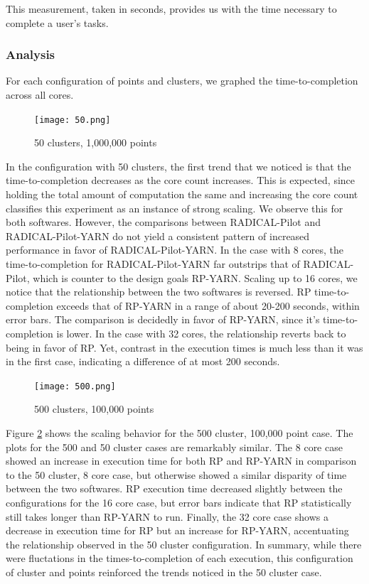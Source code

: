 \documentclass[]{article}
\begin{document}
			This measurement, taken in seconds, provides us with the time necessary to complete a user's tasks.

		\subsubsection{Analysis}

			For each configuration of points and clusters, we graphed the time-to-completion across all cores.

			\begin{figure}[H]
				\centering
				\texttt{[image: 50.png]}
				\caption{50 clusters, 1,000,000 points}
				\label{fig:50}
			\end{figure}

			In the configuration with 50 clusters, the first trend that we noticed is that the time-to-completion decreases as the core count increases. This is expected, since holding the total amount of computation the same and increasing the core count classifies this experiment as an instance of strong scaling. We observe this for both softwares. However, the comparisons between RADICAL-Pilot and RADICAL-Pilot-YARN do not yield a consistent pattern of increased performance in favor of RADICAL-Pilot-YARN. In the case with 8 cores, the time-to-completion for RADICAL-Pilot-YARN far outstrips that of RADICAL-Pilot, which is counter to the design goals RP-YARN. Scaling up to 16 cores, we notice that the relationship between the two softwares is reversed. RP time-to-completion exceeds that of RP-YARN in a range of about 20-200 seconds, within error bars. The comparison is decidedly in favor of RP-YARN, since it's time-to-completion is lower. In the case with 32 cores, the relationship reverts back to being in favor of RP. Yet, contrast in the execution times is much less than it was in the first case, indicating a difference of at most 200 seconds.

			\begin{figure}[H]
				\centering
				\texttt{[image: 500.png]}
				\caption{500 clusters, 100,000 points}
				\label{fig:500}
			\end{figure}

			Figure \ref{fig:500} shows the scaling behavior for the 500 cluster, 100,000 point case. The plots for the 500 and 50 cluster cases are remarkably similar. The 8 core case showed an increase in execution time for both RP and RP-YARN in comparison to the 50 cluster, 8 core case, but otherwise showed a similar disparity of time between the two softwares. RP execution time decreased slightly between the configurations for the 16 core case, but error bars indicate that RP statistically still takes longer than RP-YARN to run. Finally, the 32 core case shows a decrease in execution time for RP but an increase for RP-YARN, accentuating the relationship observed in the 50 cluster configuration. In summary, while there were fluctations in the times-to-completion of each execution, this configuration of cluster and points reinforced the trends noticed in the 50 cluster case. 
\end{document}
